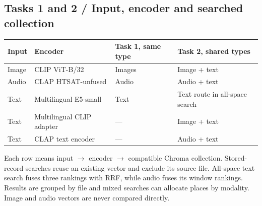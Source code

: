 \documentclass[10pt,a4paper]{article}
\begin{document}
\subsection*{Tasks 1 and 2 / Input, encoder and searched collection}
\begin{tabularx}{\linewidth}{@{}p{.14\linewidth}p{.28\linewidth}Y Y@{}}\toprule
Input & Encoder & Task 1, same type & Task 2, shared types\\\midrule
Image & CLIP ViT-B/32 & Images & Image + text\\
Audio & CLAP HTSAT-unfused & Audio & Audio + text\\
Text & Multilingual E5-small & Text & Text route in all-space search\\
Text & Multilingual CLIP adapter & --- & Image + text\\
Text & CLAP text encoder & --- & Audio + text\\\bottomrule
\end{tabularx}
\par\smallskip
Each row means input $\rightarrow$ encoder $\rightarrow$ compatible Chroma collection. Stored-record searches reuse an existing vector and exclude its source file. All-space text search fuses three rankings with RRF, while audio fuses its window rankings. Results are grouped by file and mixed searches can allocate places by modality. Image and audio vectors are never compared directly.
\end{document}
